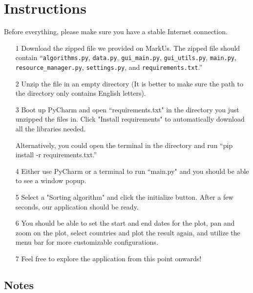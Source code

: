 \documentclass[fontsize=11pt]{article}
\begin{document}
    \newpage

    \section{Instructions}

    Before everything, please make sure you have a stable Internet connection.

    \begin{enumerate}
        \item [1]
            Download the zipped file we provided on MarkUs. The zipped file should contain ``\verb|algorithms.py|, \verb|data.py|, \verb|gui_main.py|, \verb|gui_utils.py|, \verb|main.py|, \verb|resource_manager.py|, \verb|settings.py|, and \verb|requirements.txt|.''

        \item [2]
            Unzip the file in an empty directory (It is better to make sure the path to the directory only contains English letters).
        \item [3]
            Boot up PyCharm and open ``requirements.txt" in the directory you just unzipped the files in. Click "Install requirements" to automatically download all the libraries needed.

            Alternatively, you could open the terminal in the directory and run ``pip install -r requirements.txt.''

        \item [4]
            Either use PyCharm or a terminal to run ``main.py" and you should be able to see a window popup.

        \item [5]
            Select a "Sorting algorithm" and click the initialize button. After a few seconds, our application should be ready.

        \item [6]
            You should be able to set the start and end dates for the plot, pan and zoom on the plot, select countries and plot the result again, and utilize the menu bar for more customizable configurations.

        \item [7]
            Feel free to explore the application from this point onwards!

    \end{enumerate}

    \subsection{Notes}
\end{document}
